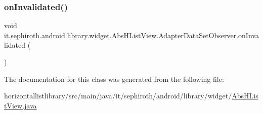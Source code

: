 \subsubsection{\texorpdfstring{on\+Invalidated()}{onInvalidated()}}
{\footnotesize\ttfamily void it.\+sephiroth.\+android.\+library.\+widget.\+Abs\+H\+List\+View.\+Adapter\+Data\+Set\+Observer.\+on\+Invalidated (\begin{DoxyParamCaption}{ }\end{DoxyParamCaption})}



The documentation for this class was generated from the following file\+:\begin{DoxyCompactItemize}
\item 
horizontallistlibrary/src/main/java/it/sephiroth/android/library/widget/\hyperlink{_abs_h_list_view_8java}{Abs\+H\+List\+View.\+java}\end{DoxyCompactItemize}
